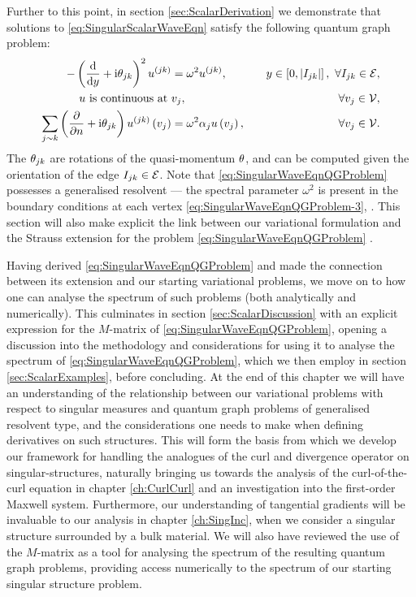 Further to this point, in section \ref{sec:ScalarDerivation} we demonstrate that solutions to \eqref{eq:SingularScalarWaveEqn} satisfy the following quantum graph problem:
\begin{subequations} \label{eq:SingularWaveEqnQGProblem}
	\begin{align}
		-\left( \dfrac{\mathrm{d}}{\mathrm{d}y} + \mathrm{i}\theta_{jk} \right)^2 u^{(jk)} &= \omega^2 u^{(jk)}, \quad &y\in\left[ 0,\left\lvert I_{jk} \right\rvert \right], \ \forall I_{jk}\in\mathcal{E}, \label{eq:SingularWaveEqnQGProblem-1} \\
		u \text{ is continuous at } & v_j, \quad &\forall v_j\in\mathcal{V}, \label{eq:SingularWaveEqnQGProblem-2} \\
		\sum_{j\sim k}\left( \dfrac{\partial }{\partial n} + \mathrm{i}\theta_{jk} \right)u^{(jk)}\left( v_j \right) &= \omega^2\alpha_j u\left( v_j \right), \quad &\forall v_j\in\mathcal{V}. \label{eq:SingularWaveEqnQGProblem-3}
	\end{align}
\end{subequations}
The $\theta_{jk}$ are rotations of the quasi-momentum $\theta$, and can be computed given the orientation of the edge $I_{jk}\in\mathcal{E}$.
Note that \eqref{eq:SingularWaveEqnQGProblem} possesses a generalised resolvent --- the spectral parameter $\omega^2$ is present in the boundary conditions at each vertex \eqref{eq:SingularWaveEqnQGProblem-3}, .
This section will also make explicit the link between our variational formulation and the Strauss extension for the problem \eqref{eq:SingularWaveEqnQGProblem} .

Having derived \eqref{eq:SingularWaveEqnQGProblem} and made the connection between its extension and our starting variational problems, we move on to how one can analyse the spectrum of such problems (both analytically and numerically).
This culminates in section \ref{sec:ScalarDiscussion} with an explicit expression for the $M$-matrix of \eqref{eq:SingularWaveEqnQGProblem}, opening a discussion into the methodology and considerations for using it to analyse the spectrum of \eqref{eq:SingularWaveEqnQGProblem}, which we then employ in section \ref{sec:ScalarExamples}, before concluding.
At the end of this chapter we will have an understanding of the relationship between our variational problems with respect to singular measures and quantum graph problems of generalised resolvent type, and the considerations one needs to make when defining derivatives on such structures.
This will form the basis from which we develop our framework for handling the analogues of the curl and divergence operator on singular-structures, naturally bringing us towards the analysis of the curl-of-the-curl equation in chapter \ref{ch:CurlCurl} and an investigation into the first-order Maxwell system.
Furthermore, our understanding of tangential gradients will be invaluable to our analysis in chapter \ref{ch:SingInc}, when we consider a singular structure surrounded by a bulk material.
We will also have reviewed the use of the $M$-matrix as a tool for analysing the spectrum of the resulting quantum graph problems, providing access numerically to the spectrum of our starting singular structure problem.